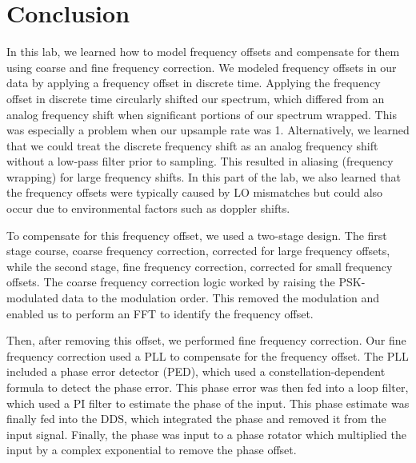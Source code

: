 \documentclass{article}
\begin{document}
\section{Conclusion}

In this lab, we learned how to model frequency offsets and compensate for them using coarse and fine frequency correction. We modeled frequency offsets in our data by applying a frequency offset in discrete time. Applying the frequency offset in discrete time circularly shifted our spectrum, which differed from an analog frequency shift when significant portions of our spectrum wrapped. This was especially a problem when our upsample rate was 1. Alternatively, we learned that we could treat the discrete frequency shift as an analog frequency shift without a low-pass filter prior to sampling. This resulted in aliasing (frequency wrapping) for large frequency shifts. In this part of the lab, we also learned that the frequency offsets were typically caused by LO mismatches but could also occur due to environmental factors such as doppler shifts.

To compensate for this frequency offset, we used a two-stage design. The first stage course, coarse frequency correction, corrected for large frequency offsets, while the second stage, fine frequency correction, corrected for small frequency offsets. The coarse frequency correction logic worked by raising the PSK-modulated data to the modulation order. This removed the modulation and enabled us to perform an FFT to identify the frequency offset.

Then, after removing this offset, we performed fine frequency correction. Our fine frequency correction used a PLL to compensate for the frequency offset. The PLL included a phase error detector (PED), which used a constellation-dependent formula to detect the phase error. This phase error was then fed into a loop filter, which used a PI filter to estimate the phase of the input. This phase estimate was finally fed into the DDS, which integrated the phase and removed it from the input signal. Finally, the phase was input to a phase rotator which multiplied the input by a complex exponential to remove the phase offset.
\end{document}
